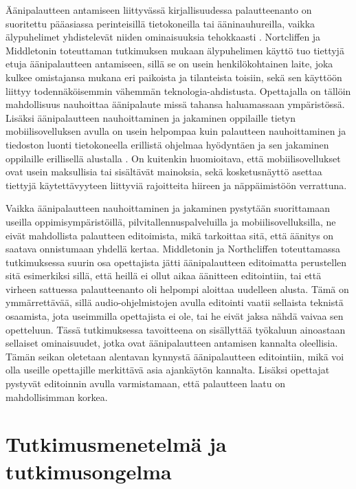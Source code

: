 \documentclass[utf8]{gradu3}
\begin{document}
Äänipalautteen antamiseen liittyvässä kirjallisuudessa palautteenanto on suoritettu pääasiassa perinteisillä tietokoneilla tai ääninauhureilla, vaikka älypuhelimet yhdistelevät niiden ominaisuuksia tehokkaasti \parencite{smartphone}. Nortcliffen ja Middletonin \parencite*{smartphone} toteuttaman tutkimuksen mukaan älypuhelimen käyttö tuo tiettyjä etuja äänipalautteen antamiseen, sillä se on usein henkilökohtainen laite, joka kulkee omistajansa mukana eri paikoista ja tilanteista toisiin, sekä sen käyttöön liittyy todennäköisemmin vähemmän teknologia-ahdistusta. Opettajalla on tällöin mahdollisuus nauhoittaa äänipalaute missä tahansa haluamassaan ympäristössä. Lisäksi äänipalautteen nauhoittaminen ja jakaminen oppilaille tietyn mobiilisovelluksen avulla on usein helpompaa kuin palautteen nauhoittaminen ja tiedoston luonti tietokoneella erillistä ohjelmaa hyödyntäen ja sen jakaminen oppilaille erillisellä alustalla \parencite{smartphone}. On kuitenkin huomioitava, että mobiilisovellukset ovat usein maksullisia tai sisältävät mainoksia, sekä kosketusnäyttö asettaa tiettyjä käytettävyyteen liittyviä rajoitteita hiireen ja näppäimistöön verrattuna. 

Vaikka äänipalautteen nauhoittaminen ja jakaminen pystytään suorittamaan useilla oppimisympäristöillä, pilvitallennuspalveluilla ja mobiilisovelluksilla, ne eivät mahdollista palautteen editoimista, mikä tarkoittaa sitä, että äänitys on saatava onnistumaan yhdellä kertaa. Middletonin ja Northcliffen \parencite*{principles} toteuttamassa tutkimuksessa suurin osa opettajista jätti äänipalautteen editoimatta perustellen sitä esimerkiksi sillä, että heillä ei ollut aikaa äänitteen editointiin, tai että virheen sattuessa palautteenanto oli helpompi aloittaa uudelleen alusta. Tämä on ymmärrettävää, sillä audio-ohjelmistojen avulla editointi vaatii sellaista teknistä osaamista, jota useimmilla opettajista ei ole, tai he eivät jaksa nähdä vaivaa sen opetteluun. Tässä tutkimuksessa tavoitteena on sisällyttää työkaluun ainoastaan sellaiset ominaisuudet, jotka ovat äänipalautteen antamisen kannalta oleellisia. Tämän seikan oletetaan alentavan kynnystä äänipalautteen editointiin, mikä voi olla useille opettajille merkittävä asia ajankäytön kannalta. Lisäksi opettajat pystyvät editoinnin avulla varmistamaan, että palautteen laatu on mahdollisimman korkea.

%

\chapter{Tutkimusmenetelmä ja tutkimusongelma}
\label{metodi}
\end{document}
